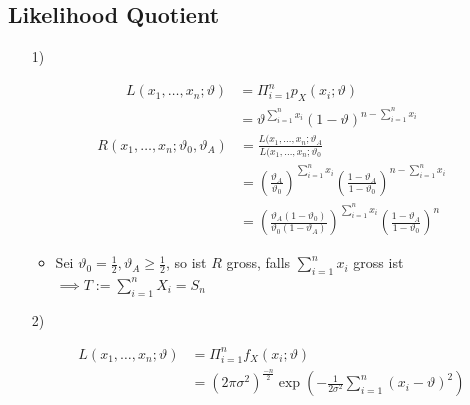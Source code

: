 \subsection{Likelihood Quotient}
\begin{itemize}
    \item[1)]
        \begin{itemize}
                \begin{align*}
                    L(x_1, \dots, x_n;\vartheta) &= \Pi_{i=1}^n p_X(x_i;\vartheta)\\
                                                 &= \vartheta^{\sum_{i=1}^n x_i}(1 - \vartheta)^{n - \sum_{i=1}^n x_i}
                \end{align*}
                \begin{align*}
                    R(x_1, \dots, x_n; \vartheta_0, \vartheta_A) &= \frac{L(x_1, \dots, x_n; \vartheta_A}{L(x_1, \dots, x_n; \vartheta_0}\\
                                                                 &= \left( \frac{\vartheta_A}{\vartheta_0} \right)^{\sum_{i=1}^n x_i} \left(\frac{1 - \vartheta_A}{1 - \vartheta_0} \right)^{n - \sum_{i = 1}^n x_i}\\
                                                                 &= \left( \frac{\vartheta_A (1 - \vartheta_0)}{\vartheta_0 (1 - \vartheta_A)} \right)^{\sum_{i=1}^n x_i} \left(\frac{1 - \vartheta_A}{1 - \vartheta_0} \right)^n
                \end{align*}
                    \begin{itemize}
                        \item Sei $\vartheta_0 = \frac{1}{2}, \vartheta_A \ge \frac{1}{2}$, so ist $R$ gross, falls $\sum_{i=1}^n x_i$ gross ist $\implies T := \sum_{i=1}^n X_i = S_n$
                    \end{itemize}
        \end{itemize}
    \item[2)]
        \begin{itemize}
                \begin{align*}
                    L(x_1, \dots, x_n;\vartheta) &= \Pi_{i=1}^n f_X(x_i;\vartheta)\\
                                                 &= (2 \pi \sigma^2)^{\frac{-n}{2}} \exp \left(- \frac{1}{2 \sigma^2} \sum_{i=1}^n (x_i -\vartheta)^2 \right)
                \end{align*}

\end{itemize}
\end{itemize}
